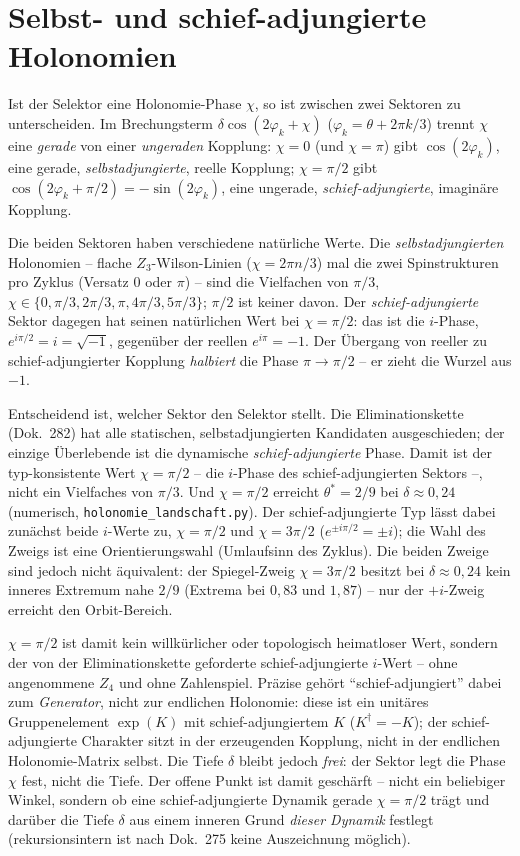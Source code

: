 \section{Selbst- und schief-adjungierte Holonomien}
Ist der Selektor eine Holonomie-Phase $\chi$, so ist zwischen zwei Sektoren zu unterscheiden. Im
Brechungsterm $\delta\cos(2\varphi_k+\chi)$ ($\varphi_k=\theta+2\pi k/3$) trennt $\chi$ eine
\emph{gerade} von einer \emph{ungeraden} Kopplung: $\chi=0$ (und $\chi=\pi$) gibt
$\cos(2\varphi_k)$, eine gerade, \emph{selbst­adjungierte}, reelle Kopplung; $\chi=\pi/2$ gibt
$\cos(2\varphi_k+\pi/2)=-\sin(2\varphi_k)$, eine ungerade, \emph{schief-adjungierte},
imaginäre Kopplung.

Die beiden Sektoren haben verschiedene natürliche Werte. Die \emph{selbst­adjungierten}
Holonomien -- flache $Z_3$-Wilson-Linien ($\chi=2\pi n/3$) mal die zwei Spinstrukturen pro
Zyklus (Versatz $0$ oder $\pi$) -- sind die Vielfachen von $\pi/3$,
$\chi\in\{0,\pi/3,2\pi/3,\pi,4\pi/3,5\pi/3\}$; $\pi/2$ ist keiner davon. Der
\emph{schief-adjungierte} Sektor dagegen hat seinen natürlichen Wert bei $\chi=\pi/2$: das ist
die $i$-Phase, $e^{i\pi/2}=i=\sqrt{-1}$, gegenüber der reellen $e^{i\pi}=-1$. Der Übergang von
reeller zu schief-adjungierter Kopplung \emph{halbiert} die Phase $\pi\to\pi/2$ -- er zieht die
Wurzel aus $-1$.

Entscheidend ist, welcher Sektor den Selektor stellt. Die Eliminationskette (Dok.~282) hat alle
statischen, selbst­adjungierten Kandidaten ausgeschieden; der einzige Überlebende ist die
dynamische \emph{schief-adjungierte} Phase. Damit ist der typ-konsistente Wert $\chi=\pi/2$ --
die $i$-Phase des schief-adjungierten Sektors --, nicht ein Vielfaches von $\pi/3$. Und
$\chi=\pi/2$ erreicht $\theta^*=2/9$ bei $\delta\approx0{,}24$ (numerisch,
\texttt{holonomie\_landschaft.py}). Der schief-adjungierte Typ lässt dabei zunächst beide
$i$-Werte zu, $\chi=\pi/2$ und $\chi=3\pi/2$ ($e^{\pm i\pi/2}=\pm i$); die Wahl des Zweigs ist
eine Orientierungswahl (Umlaufsinn des Zyklus). Die beiden Zweige sind jedoch nicht äquivalent:
der Spiegel-Zweig $\chi=3\pi/2$ besitzt bei $\delta\approx0{,}24$ kein inneres Extremum nahe
$2/9$ (Extrema bei $0{,}83$ und $1{,}87$) -- nur der $+i$-Zweig erreicht den Orbit-Bereich.

$\chi=\pi/2$ ist damit kein willkürlicher oder topologisch heimatloser Wert, sondern der von der
Eliminationskette geforderte schief-adjungierte $i$-Wert -- ohne angenommene $Z_4$ und ohne
Zahlenspiel. Präzise gehört \enquote{schief-adjungiert} dabei zum \emph{Generator}, nicht zur
endlichen Holonomie: diese ist ein unitäres Gruppenelement $\exp(K)$ mit schief-adjungiertem
$K$ ($K^\dagger=-K$); der schief-adjungierte Charakter sitzt in der erzeugenden Kopplung, nicht
in der endlichen Holonomie-Matrix selbst. Die Tiefe $\delta$ bleibt jedoch \emph{frei}: der
Sektor legt die Phase $\chi$ fest, nicht die Tiefe. Der offene Punkt ist damit geschärft --
nicht ein beliebiger Winkel, sondern ob eine schief-adjungierte Dynamik gerade $\chi=\pi/2$
trägt und darüber die Tiefe $\delta$ aus einem inneren Grund \emph{dieser Dynamik} festlegt
(rekursionsintern ist nach Dok.~275 keine Auszeichnung möglich).

